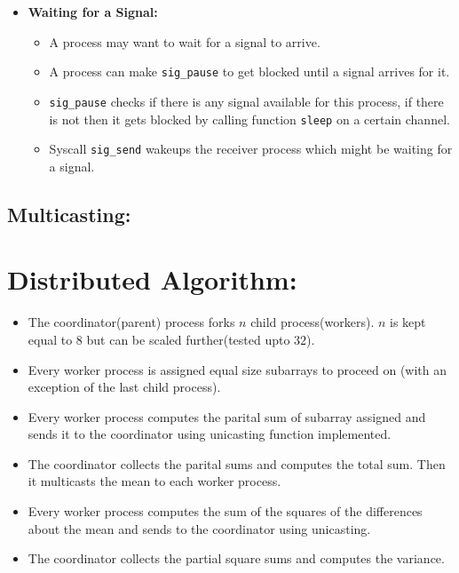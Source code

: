 \documentclass[a4 paper]{article}
\newcommand{\code}[1]{\texttt{#1}}
\begin{document}
\begin{itemize}
  \item \textbf{Waiting for a Signal:}
  \begin{itemize}
    \item A process may want to wait for a signal to arrive. 
    \item A process can make \code{sig\_pause} to get blocked until a signal arrives for it.
    \item \code{sig\_pause} checks if there is any signal available for this process, if there is not then it gets blocked by calling function \code{sleep} on a certain channel.
    \item Syscall \code{sig\_send} wakeups the receiver process which might be waiting for a signal. 
  \end{itemize}
\end{itemize}

\subsection*{Multicasting:}


\section{Distributed Algorithm:}

\begin{itemize}
  \item The coordinator(parent) process forks $n$ child process(workers). $n$ is kept equal to 8 but can be scaled further(tested upto $32$). 
  \item Every worker process is assigned equal size subarrays to proceed on (with an exception of the last child process).
  \item Every worker process computes the parital sum of subarray assigned and sends it to the coordinator using unicasting function implemented.
  \item The coordinator collects the parital sums and computes the total sum. Then it multicasts the mean to each worker process.
  \item Every worker process computes the sum of the squares of the differences about the mean and sends to the coordinator using unicasting.
  \item The coordinator collects the partial square sums and computes the variance.
\end{itemize}
\end{document}
